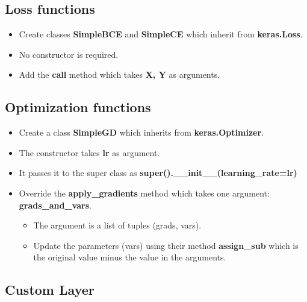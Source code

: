 \documentclass[11pt, a4paper]{article}
\begin{document}
\begin{multicols}{2}
	\subsection{Loss functions}
	
	\begin{itemize}  
		\item Create classes \textbf{SimpleBCE} and \textbf{SimpleCE} which inherit from \textbf{keras.Loss}.
		\item No constructor is required. 
		\item Add the \textbf{call} method which takes \textbf{X, Y} as arguments.
	\end{itemize}
	
	\subsection{Optimization functions}
	
	\begin{itemize}  
		\item Create a class \textbf{SimpleGD} which inherits from \textbf{keras.Optimizer}.
		\item The constructor takes \textbf{lr} as argument. 
		\item It passes it to the super class as \textbf{super().\_\_init\_\_(learning\_rate=lr)}
		\item Override the \textbf{apply\_gradients} method which takes one argument: \textbf{grads\_and\_vars}. 
		\begin{itemize}  
			\item The argument is a list of tuples (grads, vars).
			\item Update the parameters (vars) using their method \textbf{assign\_sub} which is the original value minus the value in the arguments.
		\end{itemize}
	\end{itemize}
	
	\subsection{Custom Layer}
	

\end{multicols}
\end{document}
